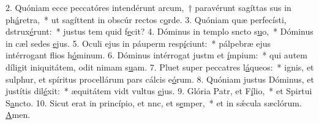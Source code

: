 2. Quóniam ecce peccatóres intendérunt arcum,~† paravérunt sagíttas sus in ph\uline{á}retra,~* ut sagíttent in obscúr rectos c\uline{o}rde.
3. Quóniam quæ perfecísti, dstrux\uline{é}runt:~* justus tem quid f\uline{e}cit?
4. Dóminus in templo sncto s\uline{u}o,~* Dóminus in cæl sedes \uline{e}jus.
5. Oculi ejus in páuperm resp\uline{í}ciunt:~* pálpebræ ejus intérrogant flios h\uline{ó}minum.
6. Dóminus intérrogat justm et \uline{í}mpium:~* qui autem díligit iniquitátem, odit nimam s\uline{u}am.
7. Pluet super peccatres l\uline{á}queos:~* ignis, et sulphur, et spíritus procellárum pars cálcis e\uline{ó}rum.
8. Quóniam justus Dóminus, et justítis dil\uline{é}xit:~* æquitátem vidt vultus \uline{e}jus.
9. Glória Patr, et F\uline{í}lio,~* et Spirtui S\uline{a}ncto.
10. Sicut erat in princípio, et nnc, et s\uline{e}mper,~* et in sǽcula sæclórum. \uline{A}men.
